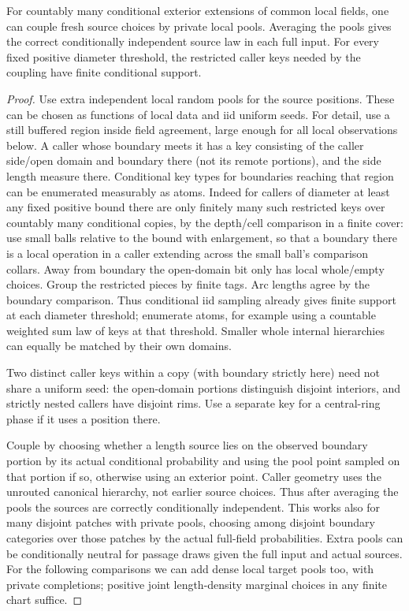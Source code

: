 \begin{lemma}\label{kern:source-pools}
For countably many conditional exterior extensions of common local fields, one can couple fresh
source choices by private local pools. Averaging the pools gives the correct conditionally
independent source law in each full input. For every fixed positive diameter threshold, the
restricted caller keys needed by the coupling have finite conditional support.
\end{lemma}
\begin{proof}

Use extra independent local random pools for the source positions. These can be chosen as functions of local
data and iid uniform seeds. For detail, use a still buffered region inside field agreement, large enough for
all local observations below. A caller whose boundary meets it has a key consisting of the caller side/open
domain and boundary there (not its remote portions), and the side length measure there. Conditional key
types for boundaries reaching that region can be enumerated measurably as atoms. Indeed for callers of
diameter at least any fixed positive bound there are only finitely many such restricted keys over countably
many conditional copies, by the depth/cell comparison in a finite cover: use small balls relative to the
bound with enlargement, so that a boundary there is a local operation in a caller extending across the small
ball's comparison collars. Away from boundary the open-domain bit only has local whole/empty choices. Group
the restricted pieces by finite tags. Arc lengths agree by the boundary comparison. Thus conditional iid
sampling already gives finite support at each diameter threshold; enumerate atoms, for example using a
countable weighted sum law of keys at that threshold. Smaller whole internal hierarchies can equally be
matched by their own domains.

Two distinct caller keys within a copy (with boundary strictly here) need not
share a uniform seed: the open-domain portions distinguish disjoint interiors, and strictly nested callers
have disjoint rims. Use a separate key for a central-ring phase if it uses a position there.

Couple by
choosing whether a length source lies on the observed boundary portion by its actual conditional probability
and using the pool point sampled on that portion if so, otherwise using an exterior point. Caller geometry
uses the unrouted canonical hierarchy, not earlier source choices. Thus after averaging the pools the
sources are correctly conditionally independent. This works also for many disjoint patches with private
pools, choosing among disjoint boundary categories over those patches by the actual full-field
probabilities. Extra pools can be conditionally neutral for passage draws given the full input and actual
sources. For the following comparisons we can add dense local target pools too, with private completions;
positive joint length-density marginal choices in any finite chart suffice.

\end{proof}

